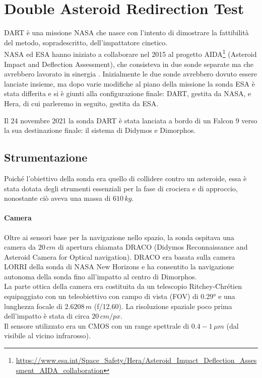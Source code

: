 \section{Double Asteroid Redirection Test}\label{sec:DART}
DART è una missione NASA che nasce con l'intento di dimostrare la fattibilità del metodo, sopradescritto, dell'impattatore cinetico.\\
NASA ed ESA hanno iniziato a collaborare nel 2015 al progetto AIDA\footnote{\href{https://www.esa.int/Space_Safety/Hera/Asteroid_Impact_Deflection_Assessment_AIDA_collaboration}{https://www.esa.int/Space\_Safety/Hera/Asteroid\_Impact\_Deflection\_Assessment\_AIDA\_collaboration}} (Asteroid Impact and Deflection Assessment), che consisteva in due sonde separate ma che avrebbero lavorato in sinergia \citep{michel_european_2018}. Inizialmente le due sonde avrebbero dovuto essere lanciate insieme, ma dopo varie modifiche al piano della missione la sonda ESA è stata differita e si è giunti alla configurazione finale: DART, gestita da NASA, e Hera, di cui parleremo in seguito, gestita da ESA.

Il 24 novembre 2021 la sonda DART è stata lanciata a bordo di un Falcon 9 verso la sua destinazione finale: il sistema di Didymos e Dimorphos.

\subsection{Strumentazione}
Poiché l'obiettivo della sonda era quello di collidere contro un asteroide, essa è stata dotata degli strumenti essenziali per la fase di crociera e di approccio, nonostante ciò aveva una massa di $610\,kg$.

\paragraph*{Camera}
Oltre ai sensori base per la navigazione nello spazio, la sonda ospitava una camera da $20\,cm$ di apertura chiamata DRACO (Didymos Reconnaissance and Asteroid Camera for Optical navigation). DRACO era basata sulla camera LORRI della sonda di NASA New Horizons e ha consentito la navigazione autonoma della sonda fino all'impatto al centro di Dimorphos.\\
La parte ottica della camera era costituita da un telescopio Ritchey-Chrétien equipaggiato con un teleobiettivo con campo di vista (FOV) di 0.29° e una lunghezza focale di $2.6208\,m$ (f/12.60). La risoluzione spaziale poco prima dell'impatto è stata di circa $20\,cm/px$.\\
Il sensore utilizzato era un CMOS con un range spettrale di $0.4-1\,\mu m$ (dal visibile al vicino infrarosso).

